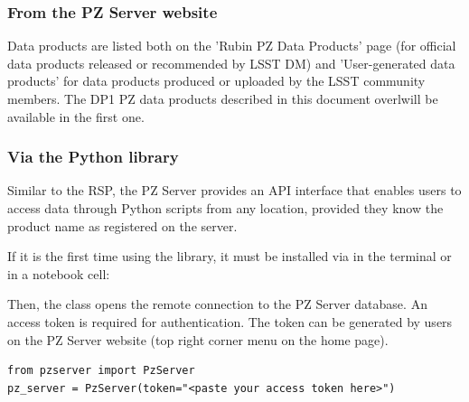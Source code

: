 \subsubsection{From the PZ Server website} 

Data products are listed both on the 'Rubin PZ Data Products' page (for official data products released or recommended by LSST DM) and 'User-generated data products' for data products produced or uploaded by the LSST community members. The DP1 PZ data products described in this document
overlwill be 
available in the first one. %


\subsubsection{Via the  Python library}

Similar to the RSP, the PZ Server provides an API interface that enables users to access data through Python scripts from any location, provided they know the product name as registered on the server. 
 
If it is the first time using the library, it must be installed via  in the terminal or in a notebook cell: 

Then, the  class opens the remote connection to the PZ Server database. An access token is required for authentication. The token can be generated by users on the PZ Server website (top right corner menu on the home page).    

\begin{verbatim}
from pzserver import PzServer
pz_server = PzServer(token="<paste your access token here>")  
\end{verbatim}

